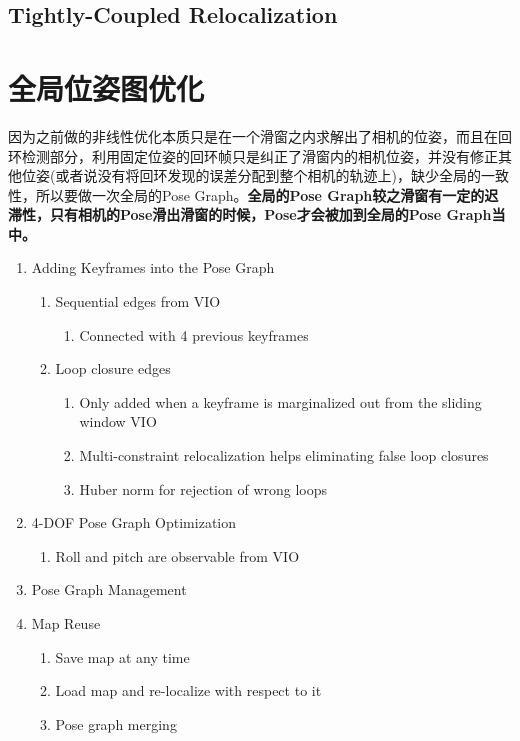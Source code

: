 \documentclass[12pt,a4paper]{article}
\begin{document}
\subsection{Tightly-Coupled Relocalization}

\section{全局位姿图优化}

因为之前做的非线性优化本质只是在一个滑窗之内求解出了相机的位姿，而且在回环检测部分，利用固定位姿的回环帧只是纠正了滑窗内的相机位姿，并没有修正其他位姿(或者说没有将回环发现的误差分配到整个相机的轨迹上)，缺少全局的一致性，所以要做一次全局的Pose Graph。\textbf{全局的Pose Graph较之滑窗有一定的迟滞性，只有相机的Pose滑出滑窗的时候，Pose才会被加到全局的Pose Graph当中。}

\begin{enumerate}
\item Adding Keyframes into the Pose Graph

\begin{enumerate}
\item Sequential edges from VIO
  \begin{enumerate}
  \item Connected with 4 previous keyframes
  \end{enumerate}
\item Loop closure edges
  \begin{enumerate}
  \item Only added when a keyframe is marginalized out from the sliding window VIO
  \item Multi-constraint relocalization helps eliminating false loop closures
  \item Huber norm for rejection of wrong loops
  \end{enumerate}
\end{enumerate}

\item 4-DOF Pose Graph Optimization

\begin{enumerate}
\item Roll and pitch are observable from VIO
\end{enumerate}

\item Pose Graph Management

\item Map Reuse

\begin{enumerate}
\item Save map at any time
\item Load map and re-localize with respect to it
\item Pose graph merging
\end{enumerate}

\end{enumerate}
\end{document}
